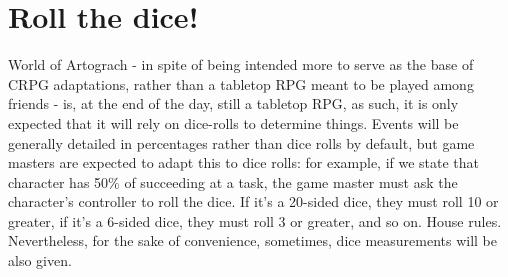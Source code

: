 \chapter{Roll the dice!}
World of Artograch - in spite of being intended more to serve as the base of CRPG adaptations, rather than a tabletop RPG meant to be played among friends - is, at the end of the day, still a tabletop RPG, as such, it is only expected that it will rely on dice-rolls to determine things. Events will be generally detailed in percentages rather than dice rolls by default, but game masters are expected to adapt this to dice rolls: for example, if we state that character has 50\% of succeeding at a task, the game master must ask the character's controller to roll the dice. If it's a 20-sided dice, they must roll 10 or greater, if it's a 6-sided dice, they must roll 3 or greater, and so on. House rules. Nevertheless, for the sake of convenience, sometimes, dice measurements will be also given.
